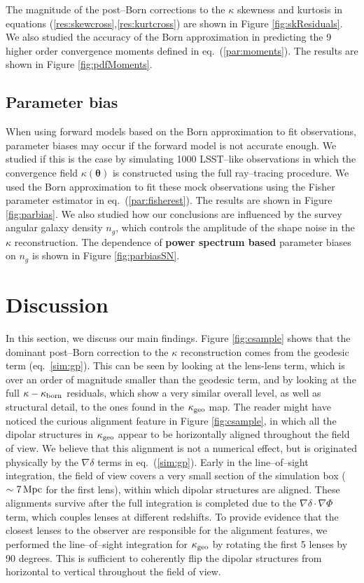 \documentclass[reprint,aps,prd,superscriptaddress,showkeys,showpacs]{revtex4-1}
\newcommand\pt{\pmb{\theta}}
\begin{document}
The magnitude of the post--Born corrections to the $\kappa$ skewness and kurtosis in equations (\ref{res:skewcross},\ref{res:kurtcross}) are shown in Figure \ref{fig:skResiduals}.
We also studied the accuracy of the Born approximation in predicting the 9 higher order convergence moments defined in eq.~(\ref{par:moments}). The results are shown in Figure \ref{fig:pdfMoments}.

\subsection{Parameter bias}
When using forward models based on the Born approximation to fit observations, parameter biases may occur if the forward model is not accurate enough. We studied if this is the case by simulating 1000 LSST--like observations in which the convergence field $\kappa(\pt)$ is constructed using the full ray--tracing procedure. We used the Born approximation to fit these mock observations using the Fisher parameter estimator in eq.~(\ref{par:fisherest}). The results are shown in Figure \ref{fig:parbias}. We also studied how our conclusions are influenced by the survey angular galaxy density $n_g$, which controls the amplitude of the shape noise in the $\kappa$ reconstruction. The dependence of \textbf{\color{blue} power spectrum based} parameter biases on $n_g$ is shown in Figure \ref{fig:parbiasSN}.   


\section{Discussion}
\label{sec:discuss}
% 
In this section, we discuss our main findings. Figure \ref{fig:csample} shows that the dominant post--Born correction to the $\kappa$ reconstruction comes from the geodesic term (eq.~\ref{sim:gp}). This can be seen by looking at the lens-lens term, which is over an order of magnitude smaller than the geodesic term, and by looking at the full $\kappa-\kappa_{\rm born}$ residuals, which show a very similar overall level, as well as structural detail, to the ones found in the $\kappa_{\rm geo}$ map. The reader might have noticed the curious alignment feature in Figure \ref{fig:csample}, in which all the dipolar structures in $\kappa_{\rm geo}$ appear to be horizontally aligned throughout the field of view. We believe that this alignment is not a numerical effect, but is originated physically by the $\nabla\delta$ terms in eq.~(\ref{sim:gp}). Early in the line--of--sight integration, the field of view covers a very small section of the simulation box ($\sim7\,{\rm Mpc}$ for the first lens), within which dipolar structures are aligned. These alignments survive after the full integration is completed due to the $\nabla\delta\cdot\nabla\Phi$ term, which couples lenses at different redshifts. To provide evidence that the closest lenses to the observer are responsible for the alignment features, we performed the line--of--sight integration for $\kappa_{\rm geo}$ by rotating the first 5 lenses by 90 degrees. This is sufficient to coherently flip the dipolar structures from horizontal to vertical throughout the field of view.
\end{document}
